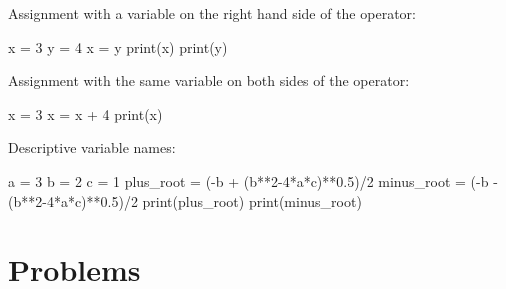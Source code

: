 \documentclass{ximera}
\begin{document}
Assignment with a variable on the right hand side of the operator:

\begin{sageCell}
x = 3
y = 4
x = y
print(x)
print(y)
\end{sageCell}

Assignment with the same variable on both sides of the operator:

\begin{sageCell}
x = 3
x = x + 4
print(x)
\end{sageCell}

Descriptive variable names:

\begin{sageCell}
a = 3
b = 2
c = 1
plus_root = (-b + (b**2-4*a*c)**0.5)/2
minus_root = (-b - (b**2-4*a*c)**0.5)/2
print(plus_root)
print(minus_root)
\end{sageCell}

\section{Problems}

\begin{question}
\end{question}

\begin{question}
\end{question}
\end{document}
